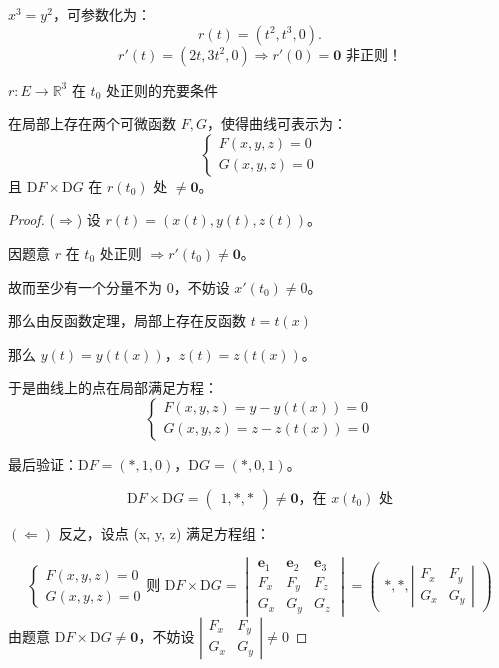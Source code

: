\documentclass[lang=cn,10pt,thmcnt=section]{elegantbook}
\renewcommand{\vec}[1]{\mathbf{#1}}
\begin{document}
\begin{example}
    $x^3 = y^2$，可参数化为：
\[
r(t) = (t^2, t^3, 0).
\]
\[
r'(t) = (2t, 3t^2, 0) \Rightarrow r'(0) = \vec{0} \text{ 非正则！}
\]
\end{example}
\begin{theorem}
    $r: E \rightarrow \mathbb{R}^3$ 在 $t_0$ 处正则的充要条件

在局部上存在两个可微函数 $F, G$，使得曲线可表示为：
\[
\begin{cases}
F(x, y, z) = 0 \\
G(x, y, z) = 0
\end{cases}
\]
且 $\text{D}F \times \text{D}G$ 在 $r(t_0)$ 处 $\neq \vec{0}$。
\end{theorem}
\begin{proof}
    ($\Rightarrow$) 设 $r(t) = (x(t), y(t), z(t))$。

因题意 $r$ 在 $t_0$ 处正则 $\Rightarrow r'(t_0) \neq \vec{0}$。

故而至少有一个分量不为 $0$，不妨设 $x'(t_0) \neq 0$。

那么由反函数定理，局部上存在反函数 $t = t(x)$

那么 $y(t) = y(t(x))$，$z(t) = z(t(x))$。

于是曲线上的点在局部满足方程：
\[
\begin{cases}
F(x, y, z) = y - y(t(x)) = 0 \\
G(x, y, z) = z - z(t(x)) = 0
\end{cases}
\]

最后验证：$\text{D}F = (*, 1, 0)$，$\text{D}G = (*, 0, 1)$。

\[
\text{D}F \times \text{D}G = \begin{pmatrix} 1, *, * \end{pmatrix} \neq \vec{0} \text{，在 } x(t_0) \text{ 处} 
\]

$(\Leftarrow)$ \quad 反之，设点 (x, y, z) 满足方程组：

\[
\begin{cases}
F(x, y, z) = 0 \\
G(x, y, z) = 0
\end{cases}\text{则 } \text{D}F \times \text{D}G = \begin{vmatrix}
\mathbf{e}_1 & \mathbf{e}_2 & \mathbf{e}_3 \\
F_x & F_y & F_z \\
G_x & G_y & G_z
\end{vmatrix} = \begin{pmatrix} *, *, \left| \begin{matrix} F_x & F_y \\ G_x & G_y \end{matrix} \right| \end{pmatrix}
\]
由题意 $\text{D}F \times \text{D}G \neq \vec{0}$，不妨设 $\left| \begin{matrix} F_x & F_y \\ G_x & G_y \end{matrix} \right| \neq 0$


\end{proof}
\end{document}
